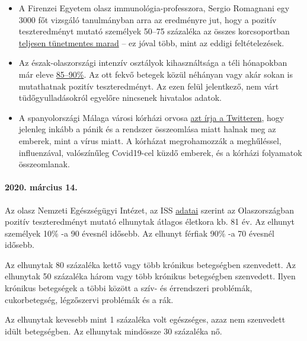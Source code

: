 \begin{itemize}
\tightlist
\item
  A Firenzei Egyetem olasz immunológia-professzora, Sergio Romagnani egy
  3000 főt vizsgáló tanulmányban arra az eredményre jut, hogy a pozitív
  teszteredményt mutató személyek 50--75 százaléka az összes
  korcsoportban
  \href{https://www.repubblica.it/salute/medicina-e-ricerca/2020/03/16/news/coronavirus_studio_il_50-75_dei_casi_a_vo_sono_asintomatici_e_molto_contagiosi-251474302/}{teljesen
  tünetmentes marad} -- ez jóval több, mint az eddigi feltételezések.
\item
  Az észak-olaszországi intenzív osztályok kihasználtsága a téli
  hónapokban már eleve
  \href{https://jamanetwork.com/journals/jama/fullarticle/2763188}{85--90\%}.
  Az ott fekvő betegek közül néhányan vagy akár sokan is mutathatnak
  pozitív teszteredményt. Az ezen felül jelentkező, nem várt
  tüdőgyulladásokról egyelőre nincsenek hivatalos adatok.
\item
  A spanyolországi Málaga városi kórházi orvosa
  \href{https://twitter.com/NeurologaenSAS/status/1239498772570308609}{azt
  írja a Twitteren}, hogy jelenleg inkább a pánik és a rendszer
  összeomlása miatt halnak meg az emberek, mint a vírus miatt. A
  kórházat megrohamozzák a meghűléssel, influenzával, valószínűleg
  Covid19-cel küzdő emberek, és a kórházi folyamatok összeomlanak.
\end{itemize}

\hypertarget{2020-muxe1rcius-14}{%
\paragraph{2020. március 14.}\label{2020-muxe1rcius-14}}

Az olasz Nemzeti Egészségügyi Intézet, az ISS
\href{https://www.epicentro.iss.it/coronavirus/sars-cov-2-decessi-italia}{adatai}
szerint az Olaszországban pozitív teszteredményt mutató elhunytak
átlagos életkora kb. 81 év. Az elhunyt személyek 10\% -a 90 évesnél
idősebb. Az elhunyt férfiak 90\% -a 70 évesnél idősebb.

Az elhunytak 80 százaléka kettő vagy több krónikus betegségben
szenvedett. Az elhunytak 50 százaléka három vagy több krónikus
betegségben szenvedett. Ilyen krónikus betegségek a többi között a szív-
és érrendszeri problémák, cukorbetegség, légzőszervi problémák és a rák.

Az elhunytak kevesebb mint 1 százaléka volt egészséges, azaz nem
szenvedett idült betegségben. Az elhunytak mindössze 30 százaléka nő.

